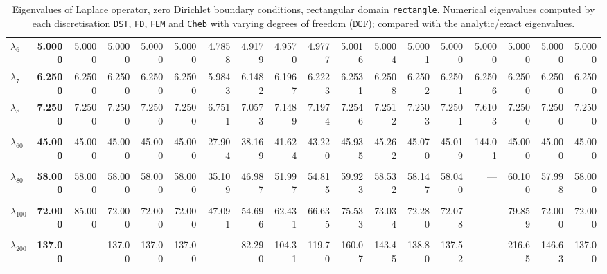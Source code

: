 \begin{table}[htbp]
{{\begin{tabular}{lrrrrrrrrrrrrrrrrr}
    $\lambda_{6}$ & \textbf{5.0000} & 5.0000 & 5.0000 & 5.0000 & 5.0000 & 4.7858 & 4.9179 & 4.9570 & 4.9777 & 5.0016 & 5.0004 & 5.0001 & 5.0000 & 5.0000 & 5.0000 & 5.0000 & 5.0000 \\
    $\lambda_{7}$ & \textbf{6.2500} & 6.2500 & 6.2500 & 6.2500 & 6.2500 & 5.9843 & 6.1482 & 6.1967 & 6.2223 & 6.2531 & 6.2508 & 6.2502 & 6.2501 & 6.2506 & 6.2500 & 6.2500 & 6.2500 \\
    $\lambda_{8}$ & \textbf{7.2500} & 7.2500 & 7.2500 & 7.2500 & 7.2500 & 6.7511 & 7.0573 & 7.1489 & 7.1974 & 7.2546 & 7.2512 & 7.2503 & 7.2501 & 7.6103 & 7.2500 & 7.2500 & 7.2500 \\
    & & & & & & & & & & & & & & & & & \\
    $\lambda_{60}$ & \textbf{45.000} & 45.000 & 45.000 & 45.000 & 45.000 & 27.904 & 38.169 & 41.624 & 43.220 & 45.935 & 45.262 & 45.070 & 45.019 & 144.01 & 45.000 & 45.000 & 45.000 \\
    & & & & & & & & & & & & & & & & & \\
    $\lambda_{80}$ & \textbf{58.000} & 58.000 & 58.000 & 58.000 & 58.000 & 35.109 & 46.987 & 51.997 & 54.815 & 59.923 & 58.532 & 58.147 & 58.040 & --- & 60.100 & 57.998 & 58.000 \\
    & & & & & & & & & & & & & & & & & \\
    $\lambda_{100}$ & \textbf{72.000} & 85.000 & 72.000 & 72.000 & 72.000 & 47.091 & 54.696 & 62.431 & 66.635 & 75.533 & 73.034 & 72.280 & 72.078 & --- & 79.859 & 72.000 & 72.000 \\
    & & & & & & & & & & & & & & & & & \\
    $\lambda_{200}$ & \textbf{137.00} & --- & 137.00 & 137.00 & 137.00 & --- & 82.290 & 104.31 & 119.70 & 160.07 & 143.45 & 138.80 & 137.52 & --- & 216.65 & 146.63 & 137.00 \\
    \bottomrule
  \end{tabular}}}
  \caption{Eigenvalues of Laplace operator, zero Dirichlet boundary conditions, rectangular domain \texttt{rectangle}. Numerical eigenvalues computed by each discretisation \texttt{DST}, \texttt{FD}, \texttt{FEM} and \texttt{Cheb} with varying degrees of freedom ($\mathtt{DOF}$); compared with the analytic/exact eigenvalues.}
  \label{tab:eigenvalues_head_rectangle_transposed_extended}
\end{table}
